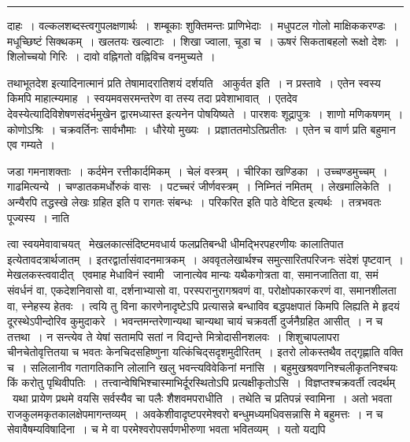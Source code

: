 \documentclass[11pt, openany]{book}
\begin{document}
\vspace{2mm}
\hrule

\noindent
{\s दाहः~। वल्कलशब्दस्त्वगुपलक्षणार्थः~। शम्बूकाः शुक्तिमन्तः प्राणिभेदाः~। मधुपटल गोलो माक्षिककरण्डः~। मधूच्छिष्टं सिक्थकम्~। खलतयः खल्वाटाः~। शिखा ज्वाला, चूडा च~। ऊषरं सिकताबहलो रूक्षो देशः~। शिलोच्चयो गिरिः~। {\qt दावो वह्निगतो वह्निविच वनमुच्यते}~।

तथाभूतदेश इत्यादिनात्मानं प्रति तेषामादरातिशयं दर्शयति \textendash\ {\qtt आकुर्वत इति}~। न प्रस्तावे~। एतेन स्वस्य किमपि माहात्म्यमाह~। स्वयमवसरमन्तरेण वा तस्य तदा प्रवेशाभावात्~। एतदेव देवस्येत्यादिविशेषणसंदर्भमुखेन द्वारमध्यास्त इत्यनेन पोषयिष्यते~। पारशवः शूद्रापुत्रः~। शाणो मणिकषणम्~। कोणोऽश्रिः~। चक्रवर्तिनः सार्वभौमाः~। धौरेयो मुख्यः~। प्रज्ञाततमोऽतिप्रतीतः~। एतेन च वार्ण प्रति बहुमान एव गम्यते~।

जडा गमनाशक्ताः~। कर्दमेन रत्तीकार्दमिकम्~। चेलं वस्त्रम्~। चीरिका खण्डिका~। उच्चण्डमुच्चम्~। गाढमित्यन्ये~। चण्डातकमर्धोरुकं वासः~। पटच्चरं जीर्णवस्त्रम्~। निम्नितं नमितम्~। {\qtt लेखमालिकेति}~। अन्यैरपि तद्धस्खे लेखः ग्रहित इति प रागतः संबन्धः~। {\qt परिकरित} इति पाठे वेष्टित इत्यर्थः~। तत्रभवतः पूज्यस्य~। {\qtt नाति}\textendash}

\newpage

\noindent
त्वा स्वयमेवावाचयत् \textendash\ मेखलकात्संदिष्टमवधार्य फलप्रतिबन्धी धीमद्भिरपहरणीयः कालातिपात इत्येतावदत्रार्थजातम्~। इतरद्वार्तासंवादनमात्रकम्~। अववृतलेखार्थश्च समुत्सारितपरिजनः संदेशं पृष्टवान्~। मेखलकस्त्ववादीत् \textendash\ एवमाह मेधाविनं स्वामी \textendash\ जानात्येव मान्यः यथैकगोत्रता वा, समानजातिता वा, समं संवर्धनं वा, एकदेशनिवासो वा, दर्शनाभ्यासो वा, परस्परानुरागश्रवणं वा, परोक्षोपकारकरणं वा, समानशीलता वा, स्नेहस्य हेतवः~। त्वयि तु विना कारणेनादृष्टेऽपि प्रत्यासन्ने बन्धाविव बद्धपक्षपातं किमपि लिह्यति मे हृदयं दूरस्थेऽपीन्दोरिव कुमुदाकरे~। भवन्तमन्तरेणान्यथा चान्यथा चायं चक्रवर्ती दुर्जनैग्रहित आसीत्~। न च तत्तथा~। न सन्त्येव ते येषां सतामपि सतां न विद्यन्ते मित्रोदासीनशलवः~। शिशुचापलापरा चीनचेतोवृत्तितया च भवतः केनचिदसहिष्णुना यत्किंचिद्सदृशमुदीरितम्~। इतरो लोकस्तथैव तद्गृह्णाति वक्ति च~। सलिलानीव गतागतिकानि लोलानि खलु भवन्त्यविवेकिनां मनांसि~। बहुमुखश्रवणनिश्चलीकृतनिश्चयः किं करोतु पृथिवीपतिः~। तत्त्वान्वेषिभिश्चास्माभिर्दूरस्थितोऽपि प्रत्यक्षीकृतोऽसि~। विज्ञप्तश्चक्रवर्ती त्वदर्थम् \textendash\ यथा प्रायेण प्रथमे वयसि सर्वस्यैव चा पलैः शैशवमपराधीति~। तथेति च प्रतिपन्नं स्वामिना~। अतो भवता राजकुलमकृतकालक्षेपमागन्तव्यम्~। अवकेशीवादृष्टपरमेश्वरो बन्धुमध्यमधिवसन्नासि मे बहुमत्तः~। न च सेवावैषम्यविषादिना~। च मे वा परमेश्वरोपसर्पणभीरुणा भवता भवितव्यम्~। यतो यद्यपि\textendash
\end{document}
